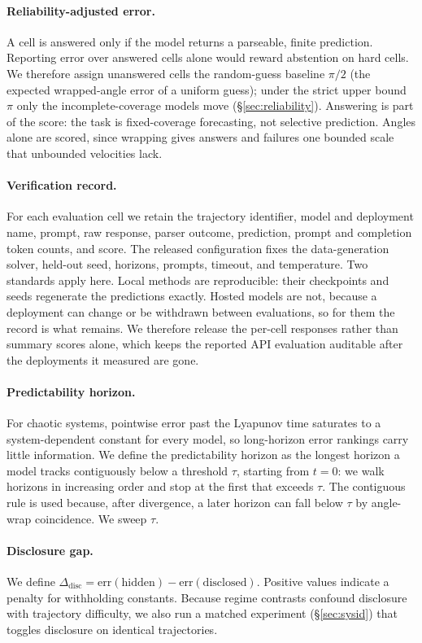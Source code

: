 \documentclass{article}
\begin{document}
\paragraph{Reliability-adjusted error.} A cell is answered only if the model returns a
parseable, finite prediction. Reporting error over answered cells alone would reward
abstention on hard cells. We therefore assign unanswered cells the random-guess baseline
$\pi/2$ (the expected wrapped-angle error of a uniform guess); under the strict upper bound
$\pi$ only the incomplete-coverage models move (\S\ref{sec:reliability}). Answering is part
of the score: the task is fixed-coverage forecasting, not selective prediction. Angles alone
are scored, since wrapping gives answers and failures one bounded scale that unbounded
velocities lack.

\paragraph{Verification record.} For each evaluation cell we retain the trajectory identifier,
model and deployment name, prompt, raw response, parser outcome, prediction, prompt and
completion token counts, and score. The released configuration fixes the data-generation
solver, held-out seed, horizons, prompts, timeout, and temperature. Two standards apply here.
Local methods are reproducible: their checkpoints and seeds regenerate the predictions exactly.
Hosted models are not, because a deployment can change or be withdrawn between evaluations, so
for them the record is what remains. We therefore release the per-cell responses rather than
summary scores alone, which keeps the reported API evaluation auditable after the deployments
it measured are gone.

\paragraph{Predictability horizon.} For chaotic systems, pointwise error past the Lyapunov
time saturates to a system-dependent constant for every model, so long-horizon error
rankings carry little information. We define the predictability horizon as the longest
horizon a model tracks contiguously below a threshold $\tau$, starting from $t{=}0$: we walk
horizons in increasing order and stop at the first that exceeds $\tau$. The contiguous rule
is used because, after divergence, a later horizon can fall below $\tau$ by angle-wrap
coincidence. We sweep $\tau$.

\paragraph{Disclosure gap.} We define
$\Delta_{\mathrm{disc}}=\mathrm{err}(\text{hidden})-\mathrm{err}(\text{disclosed})$.
Positive values indicate a penalty for withholding constants. Because regime contrasts
confound disclosure with trajectory difficulty, we also run a matched experiment
(\S\ref{sec:sysid}) that toggles disclosure on identical trajectories.
\end{document}
